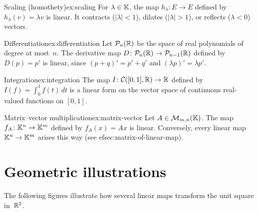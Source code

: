 \begin{example}{Scaling (homothety)}{ex:scaling}
For $\lambda\in{\mathbb{K}}$, the map $h_\lambda\colon E\to E$ defined by
$h_\lambda(v) = \lambda v$ is linear. It contracts ($|\lambda|<1$),
dilates ($|\lambda|>1$), or reflects ($\lambda<0$) vectors.
\end{example}

\begin{example}{Differentiation}{ex:differentiation}
Let ${\mathcal{P}}_n({\mathbb{R}})$ be the space of real polynomials of degree at most~$n$.
The derivative map $D\colon{\mathcal{P}}_n({\mathbb{R}})\to{\mathcal{P}}_{n-1}({\mathbb{R}})$ defined by
$D(p) = p'$ is linear, since $(p+q)' = p'+q'$ and $(\lambda p)' =
\lambda p'$.
\end{example}

\begin{example}{Integration}{ex:integration}
The map $I\colon\mathcal{C}([0,1],{\mathbb{R}})\to{\mathbb{R}}$ defined by
$I(f) = \int_0^1 f(t)\,dt$ is a linear form on the vector space of
continuous real-valued functions on $[0,1]$.
\end{example}

\begin{example}{Matrix--vector multiplication}{ex:matrix-vector}
Let $A\in\mathcal{M}_{m,n}({\mathbb{K}})$. The map $f_A\colon{\mathbb{K}}^n\to{\mathbb{K}}^m$ defined by
$f_A(x) = Ax$ is linear. Conversely, every linear map
${\mathbb{K}}^n\to{\mathbb{K}}^m$ arises this way (see 
ef{sec:matrix-of-linear-map}).
\end{example}


\section{Geometric illustrations}\label{sec:geometric-illustrations}

The following figures illustrate how several linear maps transform
the unit square in~${\mathbb{R}}^2$.


